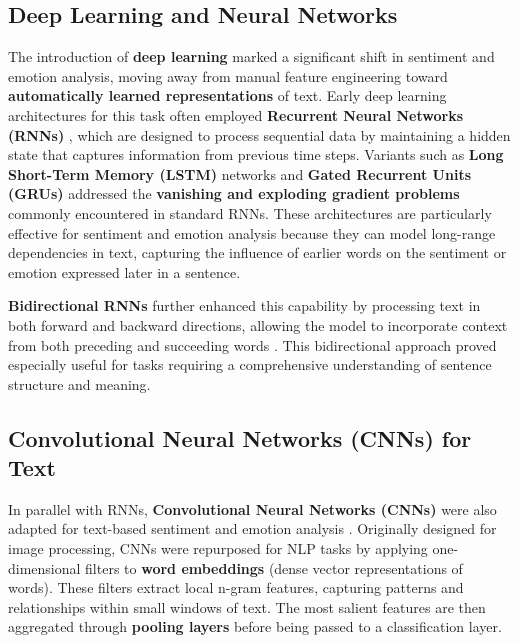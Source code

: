 \subsection*{Deep Learning and Neural Networks}

The introduction of \textbf{deep learning} marked a significant shift in sentiment and emotion analysis, moving away from manual feature engineering toward \textbf{automatically learned representations} of text. Early deep learning architectures for this task often employed \textbf{Recurrent Neural Networks (RNNs)} \cite{Mikolov:2010wx}, which are designed to process sequential data by maintaining a hidden state that captures information from previous time steps. Variants such as \textbf{Long Short-Term Memory (LSTM)} networks \cite{10.1162/neco.1997.9.8.1735} and \textbf{Gated Recurrent Units (GRUs)} \cite{cho2014learningphraserepresentationsusing} addressed the \textbf{vanishing and exploding gradient problems} commonly encountered in standard RNNs. These architectures are particularly effective for sentiment and emotion analysis because they can model long-range dependencies in text, capturing the influence of earlier words on the sentiment or emotion expressed later in a sentence.
\newline

\textbf{Bidirectional RNNs} further enhanced this capability by processing text in both forward and backward directions, allowing the model to incorporate context from both preceding and succeeding words \cite{1556215}. This bidirectional approach proved especially useful for tasks requiring a comprehensive understanding of sentence structure and meaning.

\subsection*{Convolutional Neural Networks (CNNs) for Text}

In parallel with RNNs, \textbf{Convolutional Neural Networks (CNNs)} were also adapted for text-based sentiment and emotion analysis \cite{10.5555/2999134.2999257}. Originally designed for image processing, CNNs were repurposed for NLP tasks by applying one-dimensional filters to \textbf{word embeddings} (dense vector representations of words). These filters extract local n-gram features, capturing patterns and relationships within small windows of text. The most salient features are then aggregated through \textbf{pooling layers} before being passed to a classification layer.
\newline

